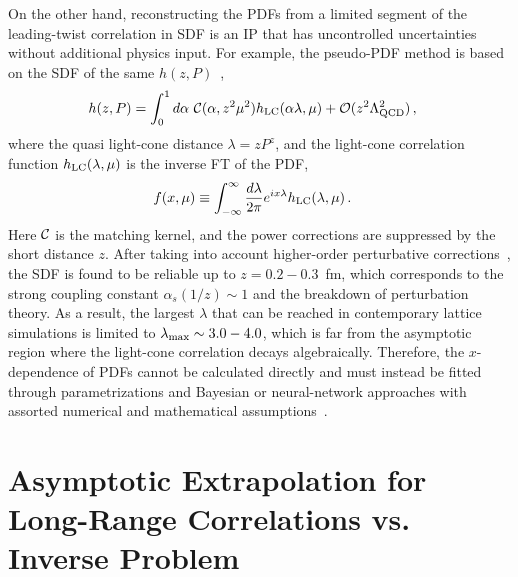 \documentclass[prd,twocolumn,superscriptaddress,preprintnumbers,showpacs,nofootinbib,notitlepage,floatfix]{revtex4-2}
\begin{document}
On the other hand, reconstructing the PDFs from a limited segment of the leading-twist correlation in SDF is an IP that has uncontrolled uncertainties without additional physics input. For example, the pseudo-PDF method is based on the SDF of the same $h(z,P)$~\cite{Ji:2017rah,Radyushkin:2017lvu,Izubuchi:2018srq},
\begin{align}\label{eq:sdf1}
    h(z,P) &= \int_0^1 d\alpha\ {\cal C}(\alpha,z^2\mu^2) h_{\rm LC}(\alpha\lambda,\mu) + {\cal O}(z^2\Lambda_{\rm QCD}^2)\,,
\end{align}
where the quasi light-cone distance $\lambda=zP^z$, and the light-cone correlation function $h_{\rm LC}(\lambda,\mu)$ is the inverse FT of the PDF,
\begin{align}\label{eq:pdf}
    f(x,\mu) &\equiv \int_{-\infty}^\infty {d\lambda \over 2\pi}e^{i x\lambda} h_{\rm LC}(\lambda,\mu)\,.
\end{align}
Here ${\cal C}$ is the matching kernel, and the power corrections are suppressed by the short distance $z$. 
After taking into account higher-order perturbative corrections~\cite{Gao:2021hxl,Holligan:2023rex,Zhang:2023bxs}, the SDF is found to be reliable up to $ z=0.2-0.3$~fm, which corresponds to the strong coupling constant $\alpha_s(1/z) \sim 1$ and the breakdown of perturbation theory. As a result, the largest $\lambda$ that can be reached in contemporary lattice simulations is limited to $\lambda_{\rm max}\sim 3.0-4.0$, which is far from the asymptotic region where the light-cone correlation decays algebraically. Therefore, the $x$-dependence of PDFs cannot be calculated directly and must instead be fitted through parametrizations and Bayesian or neural-network approaches with assorted numerical and mathematical assumptions~\cite{Orginos:2017kos,Karpie:2019eiq,DelDebbio:2020rgv,Dutrieux:2024rem}.

\section{Asymptotic Extrapolation for Long-Range Correlations vs. Inverse Problem}
\label{sec:asymptotic}
\end{document}
